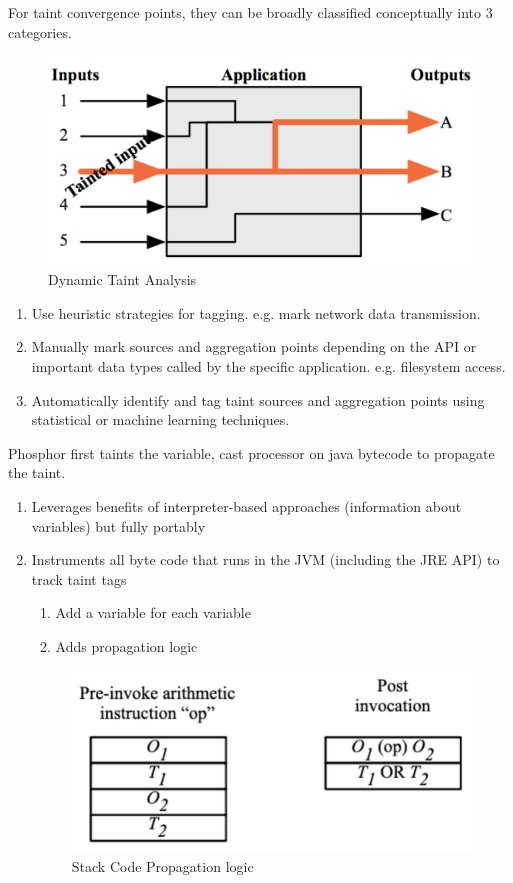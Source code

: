 \documentclass[conference]{IEEEtran}
\begin{document}
For taint convergence points, they can be broadly classified conceptually into 3 categories.
\begin{figure}[htbp]
    \centering
    \includegraphics[width=0.6\columnwidth]{./taint.png}
    \caption{Dynamic Taint Analysis}
\end{figure}
\begin{enumerate}
    \item Use heuristic strategies for tagging. e.g. mark network data transmission.
    \item Manually mark sources and aggregation points depending on the API or important data types called by the specific application. e.g. filesystem access.
    \item Automatically identify and tag taint sources and aggregation points using statistical or machine learning techniques. \cite{b7}
\end{enumerate}
Phosphor first taints the variable, cast processor on java bytecode to propagate the taint.
\begin{enumerate}
    \item Leverages benefits of interpreter-based approaches (information about variables) but fully portably
    \item Instruments all byte code that runs in the JVM (including the JRE API) to track taint tags
          \begin{enumerate}
              \item Add a variable for each variable
              \item Adds propagation logic
          \end{enumerate}
          \begin{figure}[htbp]
              \centering
              \includegraphics[width=0.6\columnwidth]{./stack_code.png}
              \caption{Stack Code Propagation logic}
          \end{figure}
\end{enumerate}
\end{document}
